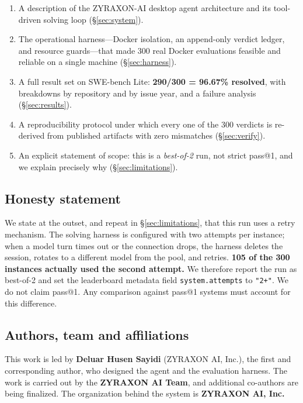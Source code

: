 \documentclass[11pt,a4paper]{article}
\begin{document}
\begin{enumerate}[leftmargin=1.4em]
  \item A description of the ZYRAXON-AI desktop agent architecture and its tool-driven
  solving loop (\S\ref{sec:system}).
  \item The operational harness---Docker isolation, an append-only verdict ledger, and
  resource guards---that made 300 real Docker evaluations feasible and reliable on a
  single machine (\S\ref{sec:harness}).
  \item A full result set on SWE-bench Lite: \textbf{290/300 = 96.67\% resolved},
  with breakdowns by repository and by issue year, and a failure analysis
  (\S\ref{sec:results}).
  \item A reproducibility protocol under which every one of the 300 verdicts is
  re-derived from published artifacts with zero mismatches (\S\ref{sec:verify}).
  \item An explicit statement of scope: this is a \emph{best-of-2} run, not strict
  pass@1, and we explain precisely why (\S\ref{sec:limitations}).
\end{enumerate}

\subsection{Honesty statement}

We state at the outset, and repeat in \S\ref{sec:limitations}, that this run uses a
retry mechanism. The solving harness is configured with two attempts per instance; when
a model turn times out or the connection drops, the harness deletes the session, rotates
to a different model from the pool, and retries. \textbf{105 of the 300 instances
actually used the second attempt.} We therefore report the run as best-of-2 and set the
leaderboard metadata field \texttt{system.attempts} to \texttt{"2+"}. We do not claim
pass@1. Any comparison against pass@1 systems must account for this difference.

\subsection{Authors, team and affiliations}

This work is led by \textbf{Deluar Husen Sayidi} (ZYRAXON AI, Inc.), the first and
corresponding author, who designed the agent and the evaluation harness. The work is
carried out by the \textbf{ZYRAXON AI Team}, and additional co-authors are being
finalized. The organization behind the system is \textbf{ZYRAXON AI, Inc.}
\end{document}
